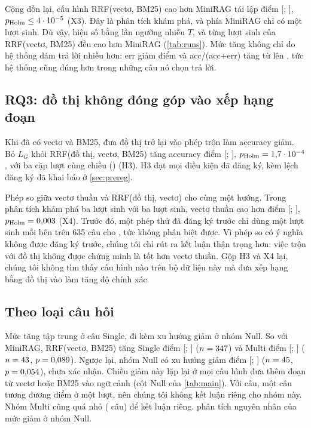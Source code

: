 Cộng dồn lại, cấu hình RRF(vectơ, BM25) cao hơn MiniRAG tái lập \diffXC{} điểm [\ciLoXC; \ciHiXC], $p_{\text{Holm}} \le 4\cdot 10^{-5}$ (X3).
Đây là phân tích khám phá, và phía MiniRAG chỉ có một lượt sinh.
Dù vậy, hiệu số bằng \ratioXCT{} lần ngưỡng nhiễu $T$, và từng lượt sinh của RRF(vectơ, BM25) đều cao hơn MiniRAG (\cref{tab:runs}).
Mức tăng không chỉ do hệ thống dám trả lời nhiều hơn: err giảm \dErrXC{} điểm và acc/(acc+err) tăng từ \precBase{} lên \precVK{}, tức hệ thống cũng đúng hơn trong những câu nó chọn trả lời.

\subsection{RQ3: đồ thị không đóng góp vào xếp hạng đoạn}\label{sec:rq3}
Khi đã có vectơ và BM25, đưa đồ thị trở lại vào phép trộn làm accuracy giảm.
Bỏ $L_G$ khỏi RRF(đồ thị, vectơ, BM25) tăng accuracy \diffHC{} điểm [\ciLoHC; \ciHiHC], $p_{\text{Holm}} = 1{,}7\cdot 10^{-4}$, với ba cặp lượt cùng chiều (\pairsHC) (H3).
H3 đạt mọi điều kiện đã đăng ký, kèm lệch đăng ký đã khai báo ở \cref{sec:prereg}.

Phép so giữa vectơ thuần và RRF(đồ thị, vectơ) cho cùng một hướng.
Trong phân tích khám phá ba lượt sinh với ba lượt sinh, vectơ thuần cao hơn \diffXD{} điểm [\ciLoXD; \ciHiXD], $p_{\text{Holm}} = 0{,}003$ (X4).
Trước đó, một phép thử đã đăng ký trước chỉ dùng một lượt sinh mỗi bên trên 635 câu cho \vecVsGVpre{}, tức không phân biệt được.
Vì phép so có ý nghĩa không được đăng ký trước, chúng tôi chỉ rút ra kết luận thận trọng hơn: việc trộn với đồ thị không được chứng minh là tốt hơn vectơ thuần.
Gộp H3 và X4 lại, chúng tôi không tìm thấy cấu hình nào trên bộ dữ liệu này mà đưa xếp hạng bằng đồ thị vào làm tăng độ chính xác.

\subsection{Theo loại câu hỏi}\label{sec:by-type}
Mức tăng tập trung ở câu Single, đi kèm xu hướng giảm ở nhóm Null.
So với MiniRAG, RRF(vectơ, BM25) tăng Single \diffXCSingle{} điểm [\ciLoXCSingle; \ciHiXCSingle] ($n=347$) và Multi \diffXCMulti{} điểm [\ciLoXCMulti; \ciHiXCMulti] ($n=43$, $p=0{,}089$).
Ngược lại, nhóm Null có xu hướng giảm \diffXCNull{} điểm [\ciLoXCNull; \ciHiXCNull] ($n=45$, $p=0{,}054$), chưa xác nhận.
Chiều giảm này lặp lại ở mọi cấu hình đưa thêm đoạn từ vectơ hoặc BM25 vào ngữ cảnh (cột Null của \cref{tab:main}).
Với \nHeldNull{} câu, một câu tương đương \ptsPerNull{} điểm ở một lượt, nên chúng tôi không kết luận riêng cho nhóm này.
Nhóm Multi cũng quá nhỏ (\nHeldMulti{} câu) để kết luận riêng.
 phân tích nguyên nhân của mức giảm ở nhóm Null.
